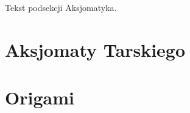 Tekst podsekcji Aksjomatyka. \loremipsum




\section{Aksjomaty Tarskiego}
\cite{greenberg_2010}

\section{Origami}
